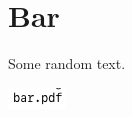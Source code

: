 \documentclass{article}
\begin{document}
\section{Bar}

Some random text.


\includegraphics{bar-img}
\end{document}
